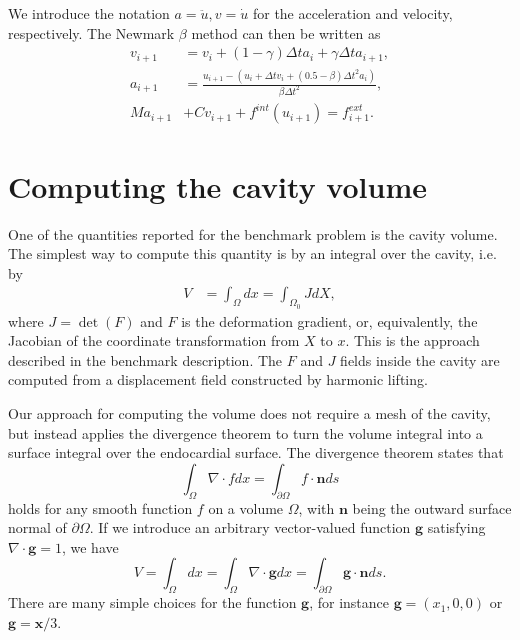 \documentclass[a4paper,10pt]{article}
\begin{document}
We introduce the notation $a= \ddot{u}, v=\dot{u}$
for the acceleration and velocity, respectively. The Newmark $\beta$ method can then
be written as
\begin{align}
v_{i+1} &= v_i + (1-\gamma) \Delta t a_i + \gamma \Delta t a_{i+1}, \\
a_{i+1} &= \frac{u_{i+1} - (u_i + \Delta t v_i + (0.5 - \beta) \Delta t^2 a_i)}{\beta \Delta t^2}, \\
Ma_{i+1} &+ C v_{i+1} + f^{int}(u_{i+1}) = f^{ext}_{i+1}.
\end{align}

\appendix
\section{Computing the cavity volume}
One of the quantities reported for the benchmark problem is the cavity volume.
The simplest way to compute this quantity is by an integral over the cavity, i.e.
by
\begin{align}
V &= \int_\Omega dx = \int_{\Omega_0} J dX,
\label{vol0}\end{align}
where $J=\det(F)$ and $F$ is the deformation gradient, or,
equivalently, the Jacobian of the coordinate transformation from $X$
to $x$. This is the approach described in the benchmark description.
The $F$ and $J$ fields inside the cavity are computed from a displacement field
constructed by harmonic lifting.

Our approach for computing the volume does not require a mesh of the cavity,
but instead applies the divergence theorem to turn the volume integral into
a surface integral over the endocardial surface. The divergence theorem states
that
\[
\int_\Omega \nabla\cdot f dx = \int_{\partial\Omega} f\cdot \mathbf{n} ds
\]
holds for any smooth function $f$ on a volume $\Omega$, with $\mathbf{n}$ being the
outward surface normal of $\partial\Omega$. If we introduce an
arbitrary vector-valued function $\mathbf{g}$ satisfying $\nabla\cdot \mathbf{g} = 1$, we have
\[
V =\int_{\Omega} dx = \int_{\Omega}\nabla\cdot \mathbf{g}dx
= \int_{\partial\Omega}\mathbf{g}\cdot\mathbf{n}ds .
\]
There are many simple choices for the function $\mathbf{g}$, for instance $\mathbf{g}=(x_1,0,0)$ or
$\mathbf{g}=\mathbf{x}/3$.
\end{document}
